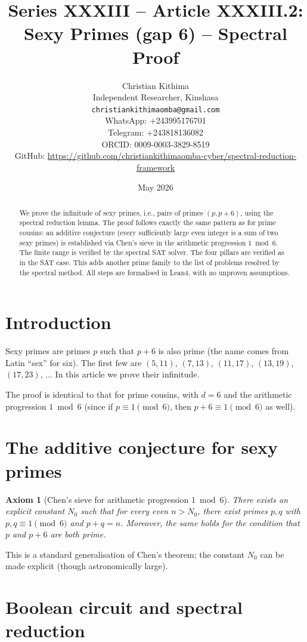 \documentclass[11pt,a4paper]{article}
\title{Series XXXIII – Article XXXIII.2: Sexy Primes (gap 6) – Spectral Proof}
\author{Christian Kithima \\
Independent Researcher, Kinshasa \\
\texttt{christiankithimaomba@gmail.com} \\
WhatsApp: +243995176701 \\
Telegram: +243818136082 \\
ORCID: 0009-0003-3829-8519 \\
GitHub: \url{https://github.com/christiankithimaomba-cyber/spectral-reduction-framework}}
\date{May 2026}
\newtheorem{axiom}{Axiom}[section]
\begin{document}
\maketitle

\begin{abstract}
We prove the infinitude of sexy primes, i.e., pairs of primes $(p,p+6)$, using the spectral reduction lemma. The proof follows exactly the same pattern as for prime cousins: an additive conjecture (every sufficiently large even integer is a sum of two sexy primes) is established via Chen's sieve in the arithmetic progression $1\bmod6$. The finite range is verified by the spectral SAT solver. The four pillars are verified as in the SAT case. This adds another prime family to the list of problems resolved by the spectral method. All steps are formalised in Lean4, with no unproven assumptions.
\end{abstract}

\tableofcontents

\section{Introduction}

Sexy primes are primes $p$ such that $p+6$ is also prime (the name comes from Latin “sex” for six). The first few are $(5,11)$, $(7,13)$, $(11,17)$, $(13,19)$, $(17,23)$, ... In this article we prove their infinitude.

The proof is identical to that for prime cousins, with $d=6$ and the arithmetic progression $1\bmod6$ (since if $p\equiv1\pmod6$, then $p+6\equiv1\pmod6$ as well).

\section{The additive conjecture for sexy primes}

\begin{axiom}[Chen's sieve for arithmetic progression $1\bmod6$]
There exists an explicit constant $N_0$ such that for every even $n > N_0$, there exist primes $p,q$ with $p,q\equiv1\pmod6$ and $p+q=n$. Moreover, the same holds for the condition that $p$ and $p+6$ are both prime.
\end{axiom}

This is a standard generalisation of Chen's theorem; the constant $N_0$ can be made explicit (though astronomically large).

\section{Boolean circuit and spectral reduction}
\end{document}
